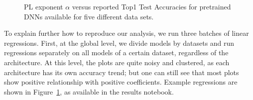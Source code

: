 \begin{figure}[t]
{    }
    \qquad
    \caption{%
             PL exponent $\alpha$ versus reported Top1 Test Accuracies for pretrained DNNs available for five different data sets.
            }
    \label{fig:DSalphas}
\end{figure}

To explain further how to reproduce our analysis, we run three batches of linear regressions. 
First, at the global level, we divide models by datasets and run regressions separately on all models of a certain dataset, regardless of the architecture. 
At this level, the plots are quite noisy and clustered, as each architecture has its own accuracy trend; but one can
 still see that most plots show positive relationship with positive coefficients. 
Example regressions are shown in Figure~\ref{fig:DSalphas}, as available in the results notebook.
 
